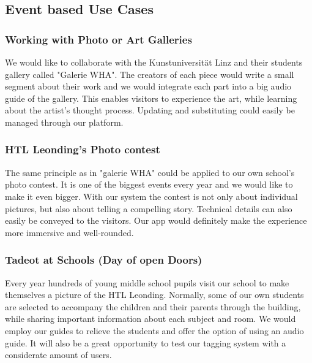 \documentclass[12pt]{article}
\theoremstyle{definition}
\newenvironment{text}{
}{}
\begin{document}
\subsection{Event based Use Cases}

\subsubsection{Working with Photo or Art Galleries}
\begin{text}
We would like to collaborate with the Kunstuniversität Linz and their students gallery called "Galerie WHA". The creators of each piece would write a small segment about their work and we would integrate each part into a big audio guide of the gallery. This enables visitors to experience the art, while learning about the artist's thought process. Updating and substituting could easily be managed through our platform.
\end{text}

\subsubsection{HTL Leonding's Photo contest}
\begin{text}
The same principle as in "galerie WHA" could be applied to our own school's photo contest. It is one of the biggest events every year and we would like to make it even bigger.  With our system the contest is not only about individual pictures, but also about telling a compelling story. Technical details can also easily be conveyed to the visitors. Our app would definitely make the experience more immersive and well-rounded.
\end{text}

\subsubsection{Tadeot at Schools (Day of open Doors)}
\begin{text}
Every year hundreds of young middle school pupils visit our school to make themselves a picture of the HTL Leonding. Normally, some of our own students are selected to accompany the children and their parents through the building, while sharing important information about each subject and room. We would employ our guides to relieve the students and offer the option of using an audio guide. 
It will also be a great opportunity to test our tagging system with a considerate amount of users.
\end{text}
\end{document}
